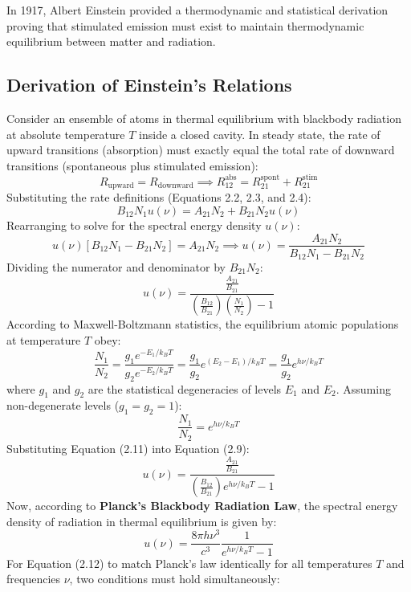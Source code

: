 In 1917, Albert Einstein provided a thermodynamic and statistical derivation proving that stimulated emission must exist to maintain thermodynamic equilibrium between matter and radiation.

\subsection{Derivation of Einstein's Relations}
Consider an ensemble of atoms in thermal equilibrium with blackbody radiation at absolute temperature $T$ inside a closed cavity. In steady state, the rate of upward transitions (absorption) must exactly equal the total rate of downward transitions (spontaneous plus stimulated emission):
\begin{equation}
    R_{\text{upward}} = R_{\text{downward}} \implies R_{12}^{\text{abs}} = R_{21}^{\text{spont}} + R_{21}^{\text{stim}}
\end{equation}
Substituting the rate definitions (Equations 2.2, 2.3, and 2.4):
\begin{equation}
    B_{12} N_1 u(\nu) = A_{21} N_2 + B_{21} N_2 u(\nu)
\end{equation}
Rearranging to solve for the spectral energy density $u(\nu)$:
\begin{equation}
    u(\nu) \left[ B_{12} N_1 - B_{21} N_2 \right] = A_{21} N_2 \implies u(\nu) = \frac{A_{21} N_2}{B_{12} N_1 - B_{21} N_2}
\end{equation}
Dividing the numerator and denominator by $B_{21} N_2$:
\begin{equation}
    u(\nu) = \frac{\frac{A_{21}}{B_{21}}}{\left( \frac{B_{12}}{B_{21}} \right) \left( \frac{N_1}{N_2} \right) - 1}
\end{equation}
According to Maxwell-Boltzmann statistics, the equilibrium atomic populations at temperature $T$ obey:
\begin{equation}
    \frac{N_1}{N_2} = \frac{g_1 e^{-E_1 / k_B T}}{g_2 e^{-E_2 / k_B T}} = \frac{g_1}{g_2} e^{(E_2 - E_1) / k_B T} = \frac{g_1}{g_2} e^{h\nu / k_B T}
\end{equation}
where $g_1$ and $g_2$ are the statistical degeneracies of levels $E_1$ and $E_2$. Assuming non-degenerate levels ($g_1 = g_2 = 1$):
\begin{equation}
    \frac{N_1}{N_2} = e^{h\nu / k_B T}
\end{equation}
Substituting Equation (2.11) into Equation (2.9):
\begin{equation}
    u(\nu) = \frac{\frac{A_{21}}{B_{21}}}{\left( \frac{B_{12}}{B_{21}} \right) e^{h\nu / k_B T} - 1}
\end{equation}
Now, according to \textbf{Planck's Blackbody Radiation Law}, the spectral energy density of radiation in thermal equilibrium is given by:
\begin{equation}
    u(\nu) = \frac{8\pi h \nu^3}{c^3} \frac{1}{e^{h\nu / k_B T} - 1}
\end{equation}
For Equation (2.12) to match Planck's law identically for all temperatures $T$ and frequencies $\nu$, two conditions must hold simultaneously:

